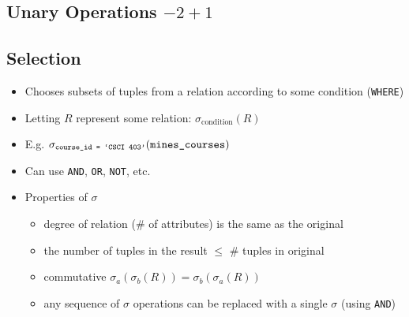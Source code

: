 \documentclass{../cheatsheet}
\begin{document}
\begin{multicols*}{2}
    \section{Unary Operations $-2 + 1$}
    \subsection{Selection}
    \begin{itemize}
        \item Chooses subsets of tuples from a relation according to some
            condition (\texttt{WHERE})

        \item Letting $R$ represent some relation:
            \(\sigma_{\text{condition}}(R)\)

        \item E.g. \( \sigma_{\text{\texttt{course\_id = `CSCI 403'}}}
            (\text{\texttt{mines\_courses}}) \)
        \item Can use \texttt{AND}, \texttt{OR}, \texttt{NOT}, etc.
        \item Properties of $\sigma$
            \begin{itemize}
                \item degree of relation (\# of attributes) is the same as the
                    original
                \item the number of tuples in the result $\leq$ \# tuples in
                    original
                \item commutative \(\sigma_{a}(\sigma_{b}(R)) =
                    \sigma_{b}(\sigma_a(R))\)
                \item any sequence of $\sigma$ operations can be replaced with a
                    single $\sigma$ (using \texttt{AND})
            \end{itemize}
    \end{itemize}


\end{multicols*}
\end{document}
